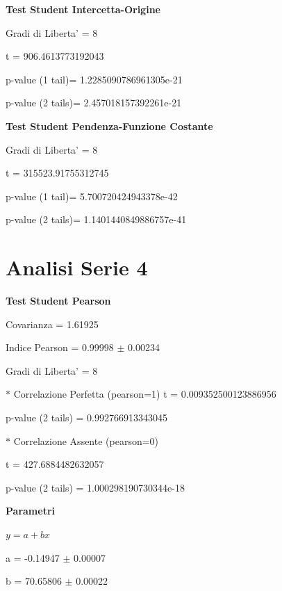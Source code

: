 \documentclass{article}
\begin{document}
\textbf{Test Student Intercetta-Origine}

Gradi di Liberta' = 8

t = 906.4613773192043

p-value (1 tail)= 1.2285090786961305e-21

p-value (2 tails)= 2.457018157392261e-21

\textbf{Test Student Pendenza-Funzione Costante}

Gradi di Liberta' = 8

t = 315523.91755312745

p-value (1 tail)= 5.700720424943378e-42

p-value (2 tails)= 1.1401440849886757e-41

\section*{Analisi Serie 4}

\textbf{Test Student Pearson}

Covarianza = 1.61925

Indice Pearson = 0.99998 $\pm$ 0.00234

Gradi di Liberta' = 8

$\ast$ Correlazione Perfetta (pearson=1)
t = 0.009352500123886956

p-value (2 tails) = 0.992766913343045

$\ast$ Correlazione Assente (pearson=0)

t = 427.6884482632057

p-value (2 tails) = 1.000298190730344e-18

\textbf{Parametri}

$y = a + bx$

a = -0.14947 $\pm$ 0.00007

b = 70.65806 $\pm$ 0.00022
\end{document}
